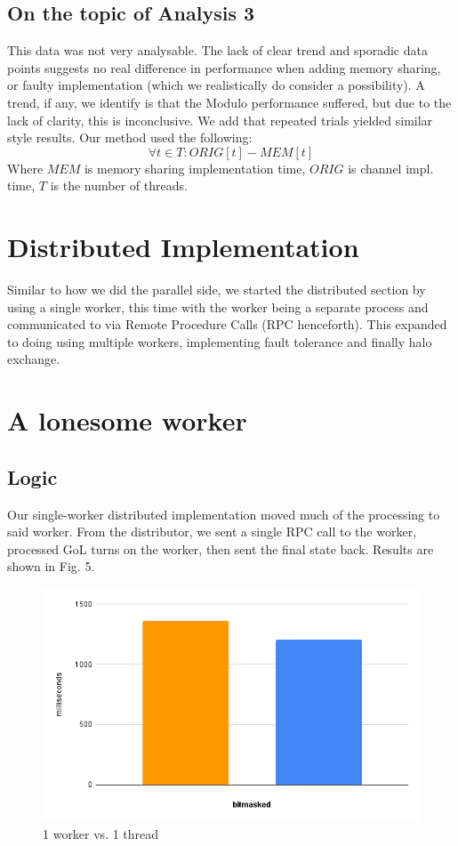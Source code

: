 \documentclass[twoside,twocolumn]{article}
\begin{document}
\subsection{On the topic of Analysis 3}
This data was not very analysable. The lack of clear trend and sporadic data points suggests no real difference 
in performance when adding memory sharing, or faulty implementation (which we realistically do consider a possibility).
A trend, if any, we identify is that the Modulo performance suffered, but due to the lack of clarity, this is inconclusive.
We add that repeated trials yielded similar style results. Our method used the following: \[\forall t \in T: ORIG[t] - MEM[t]\]
Where $MEM$ is memory sharing implementation time, $ORIG$ is channel impl. time, $T$ is the number of threads. 

\section{Distributed Implementation}
Similar to how we did the parallel side, we started the distributed section by using a single worker, this time
with the worker being a separate process and communicated to via Remote Procedure Calls (RPC henceforth). This expanded to
doing using multiple workers, implementing fault tolerance and finally halo exchange.

\section{A lonesome worker}
\subsection{Logic}
Our single-worker distributed implementation moved much of the processing to said worker. From the distributor, we sent a 
single RPC call to the worker, processed GoL turns on the worker, then sent the final state back. Results are shown in Fig. 5.
\begin{figure}
  \includegraphics[width=\linewidth]{1v1.png}
  \caption{1 worker vs. 1 thread}
  \label{fig:chart5}
\end{figure}
\end{document}
